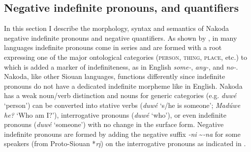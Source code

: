 \documentclass[output=paper,colorlinks,citecolor=brown]{langscibook}
\begin{document}
\subsection{Negative indefinite pronouns, and quantifiers}\label{sec:nak:3.2}

In this section I describe the morphology, syntax and semantics of Nakoda negative indefinite pronouns and negative quantifiers. As shown by \citet[21--22]{Haspelmath1997}, in many languages indefinite pronouns come in series and are formed with a root expressing one of the major ontological categories (\textsc{person, thing, place}, etc.) to which is added a marker of indefiniteness, as in English \textit{some-}, \textit{any-}, and \textit{no-}. Nakoda, like other Siouan languages, functions differently since indefinite pronouns do not have a dedicated indefinite morpheme like in English.  Nakoda has a weak noun/verb distinction and nouns for generic categories (e.g. \textit{duwé} ‘person’) can  be converted into stative verbs (\textit{duwé} ‘s/he is someone’; \textit{Madúwe he?} ‘Who am I?’), interrogative pronouns (\textit{duwé} ‘who’), or even indefinite pronouns (\textit{duwé} ‘someone’) with no change in the surface form. Negative indefinite pronouns are formed by adding the negative suffix \textit{-ni} {\textasciitilde}\textit{-na} for some speakers (from Proto-Siouan *\textit{rį}) on the interrogative pronouns as indicated in .
\end{document}
